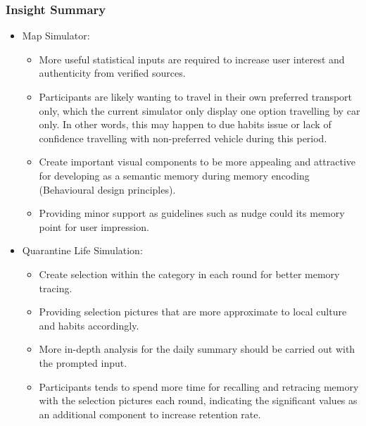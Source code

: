     \subsubsection{Insight Summary}
      \begin{itemize}
        \item Map Simulator:
          \begin{itemize}
            \item More useful statistical inputs are required to increase user interest and authenticity from verified sources. 
            \item Participants are likely wanting to travel in their own preferred transport only, which the current simulator only display one option travelling by car only. In other words, this may happen to due habits issue or lack of confidence travelling with non-preferred vehicle during this period.
            \item Create important visual components to be more appealing and attractive for developing as a semantic memory during memory encoding (Behavioural design principles).
            \item Providing minor support as guidelines such as nudge could its memory point for user impression.
          \end{itemize}
        \item Quarantine Life Simulation:
          \begin{itemize}
            \item Create selection within the category in each round for better memory tracing.
            \item Providing selection pictures that are more approximate to local culture and habits accordingly.
            \item More in-depth analysis for the daily summary should be carried out with the prompted input.
            \item Participants tends to spend more time for recalling and retracing memory with the selection pictures each round, indicating the significant values as an additional component to increase retention rate.
          \end{itemize}
      \end{itemize}

  
      
